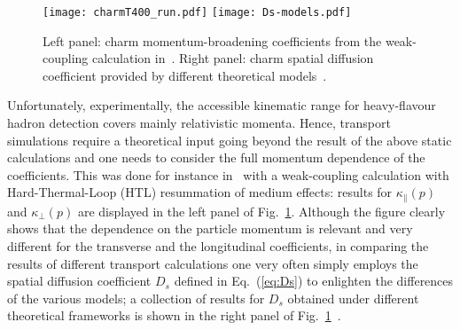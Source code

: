 \documentclass{PoS}
\def\kk{{\kappa}}
\begin{document}
\begin{figure}[!ht]
\begin{center}
\texttt{[image: charmT400\_run.pdf]}
\texttt{[image: Ds-models.pdf]}
\caption{Left panel: charm momentum-broadening coefficients from the weak-coupling calculation in~\cite{Alberico:2013bza}. Right panel: charm spatial diffusion coefficient provided by different theoretical models~\cite{Prino:2016cni}.}\label{fig:transp-coeff2} 
\end{center}
\end{figure}
Unfortunately, experimentally, the accessible kinematic range for heavy-flavour hadron detection covers mainly relativistic momenta. Hence, transport simulations require a theoretical input going beyond the result of the above static calculations and one needs to consider the full momentum dependence of the coefficients. This was done for instance in~\cite{Alberico:2013bza} with a weak-coupling calculation with Hard-Thermal-Loop (HTL) resummation of medium effects: results for $\kk_\|(p)$ and $\kk_\perp(p)$ are displayed in the left panel of Fig.~\ref{fig:transp-coeff2}. Although the figure clearly shows that the dependence on the particle momentum is relevant and very different for the transverse and the longitudinal coefficients, in comparing the results of different transport calculations one very often simply employs the spatial diffusion coefficient $D_s$ defined in Eq.~(\ref{eq:Ds}) to enlighten the differences of the various models; a collection of results for $D_s$ obtained under different theoretical frameworks is shown in the right panel of Fig.~\ref{fig:transp-coeff2}~\cite{Prino:2016cni}.
\end{document}

